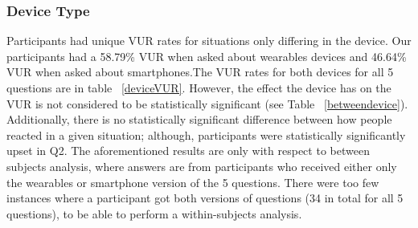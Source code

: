 \documentclass{acm_proc_article-sp}
\begin{document}
%
%

\subsubsection{Device Type}
Participants had unique VUR rates for situations only differing in the device. Our participants had a 58.79\% VUR when asked about wearables devices and 46.64\% VUR when asked about smartphones.The VUR rates for both devices for all 5 questions are in table ~\ref{deviceVUR}. However, the effect the device has on the VUR is not considered to be statistically significant (see Table ~\ref{betweendevice}). Additionally, there is no statistically significant difference between how people reacted in a given situation; although, participants were statistically significantly upset in Q2.  The aforementioned results are only with respect to between subjects analysis, where answers are from participants who received either only the wearables or smartphone version of the 5 questions. There were too few instances where a participant got both versions of questions (34 in total for all 5 questions), to be able to perform a within-subjects analysis. 
\end{document}
